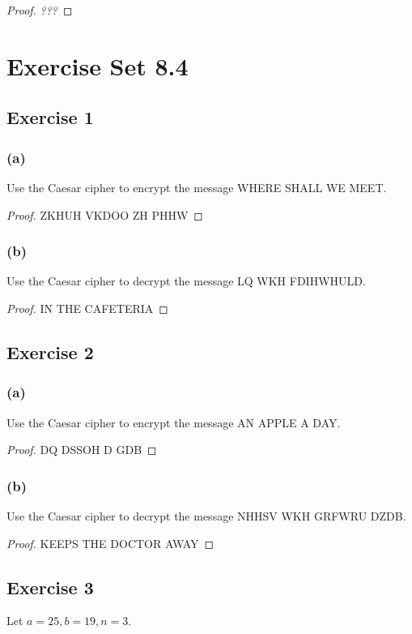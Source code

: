 \documentclass[14pt]{extarticle}
\begin{document}
\begin{proof}
        {\it ???}
\end{proof}

\section{Exercise Set 8.4}

\subsection{Exercise 1}
\subsubsection{(a)}
Use the Caesar cipher to encrypt the message WHERE SHALL WE MEET.

\begin{proof}
        ZKHUH VKDOO ZH PHHW
\end{proof}

\subsubsection{(b)}
Use the Caesar cipher to decrypt the message LQ WKH FDIHWHULD.

\begin{proof}
        IN THE CAFETERIA
\end{proof}

\subsection{Exercise 2}
\subsubsection{(a)}
Use the Caesar cipher to encrypt the message AN APPLE A DAY.

\begin{proof}
        DQ DSSOH D GDB
\end{proof}

\subsubsection{(b)}
Use the Caesar cipher to decrypt the message NHHSV WKH GRFWRU DZDB.

\begin{proof}
        KEEPS THE DOCTOR AWAY
\end{proof}

\subsection{Exercise 3}
Let \(a = 25, b = 19, n = 3\).
\end{document}
